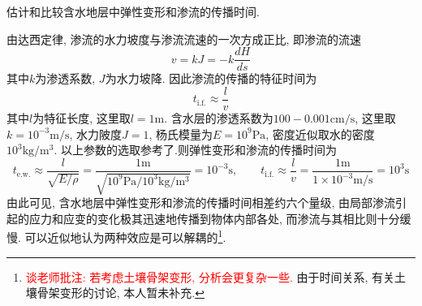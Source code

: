 \begin{problem}[30]
估计和比较含水地层中弹性变形和渗流的传播时间.
\end{problem}
\begin{solution}
由达西定律, 渗流的水力坡度与渗流流速的一次方成正比, 即渗流的流速
\[
v = kJ = -k \frac{dH}{ds}
\]
其中$k$为渗透系数, $J$为水力坡降. 因此渗流的传播的特征时间为
\[
t_\mathrm{i.f.} \approx \frac{l}{v}
\]
其中$l$为特征长度, 这里取$l=1\mathrm{m}$.  含水层的渗透系数为$100-0.001\mathrm{cm/s}$, 这里取$k=10^{-3}\mathrm{m/s}$, 水力陂度$J=1$, 杨氏模量为$E=10^9 \mathrm{Pa}$, 密度近似取水的密度$10^3\mathrm{kg/m^3}$. 以上参数的选取参考了\cite{basic_Hydrogeology, viera_mathematical_2012, wiki_hydraulic_conductivity}.则弹性变形和渗流的传播时间为
\[
t_\mathrm{e.w.} \approx \frac{l}{\sqrt{E/\rho}} = \frac{1\mathrm{m}}{\sqrt{10^9 \mathrm{Pa}/ 10^3\mathrm{kg/m^3}}} = 10^{-3} \mathrm{s},
\qquad
t_\mathrm{i.f.} \approx  \frac{l}{v} = \frac{1\mathrm{m}}{1\times10^{-3}\mathrm{m/s}} = 10^3 \mathrm{s}
\]
由此可见, 含水地层中弹性变形和渗流的传播时间相差约六个量级, 由局部渗流引起的应力和应变的变化极其迅速地传播到物体内部各处, 而渗流与其相比则十分缓慢. 可以近似地认为两种效应是可以解耦的\footnote{\textcolor{red}{谈老师批注: 若考虑土壤骨架变形, 分析会更复杂一些.} 由于时间关系, 有关土壤骨架变形的讨论, 本人暂未补充.}.
\end{solution}
